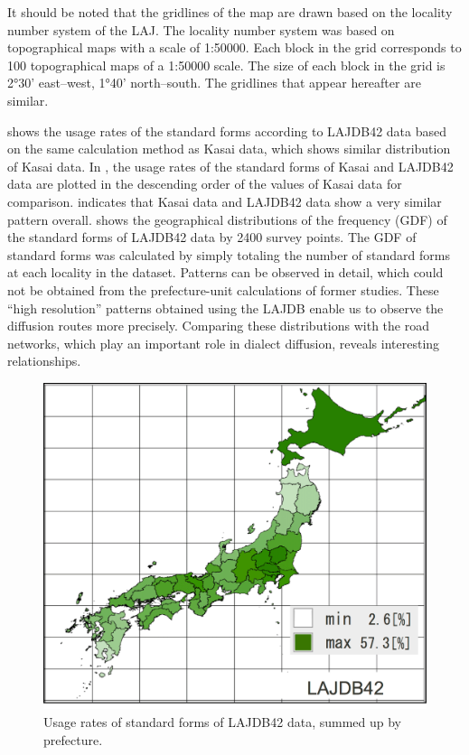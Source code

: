 \documentclass[output=paper]{LSP/langsci}
\begin{document}
It should be noted that the gridlines of the map are drawn based on the locality number system of the LAJ. The locality number system was based on topographical maps with a scale of 1:50000. Each block in the grid corresponds to 100 topographical maps of a 1:50000 scale. The size of each block in the grid is 2°30' east–west, 1°40' north–south. The gridlines that appear hereafter are similar.

 shows the usage rates of the standard forms according to LAJDB42 data based on the same calculation method as Kasai data, which shows similar distribution of Kasai data. In , the usage rates of the standard forms of Kasai and LAJDB42 data are plotted in the descending order of the values of Kasai data for comparison.  indicates that Kasai data and LAJDB42 data show a very similar pattern overall.  shows the geographical distributions of the frequency (GDF) of the standard forms of LAJDB42 data by 2400 survey points. The GDF of standard forms was calculated by simply totaling the number of standard forms at each locality in the dataset. Patterns can be observed in detail, which could not be obtained from the prefecture-unit calculations of former studies. These “high resolution” patterns obtained using the LAJDB enable us to observe the diffusion routes more precisely. Comparing these distributions with the road networks, which play an important role in dialect diffusion, reveals interesting relationships.


\begin{figure}[p]
\includegraphics[height=0.4\textheight]{illustrations/kuma_fig04}
\caption{Usage rates of standard forms of LAJDB42 data, summed up by prefecture.}          
\label{fig:4}
\end{figure}  
\end{document}
